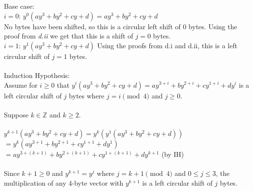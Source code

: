 \documentclass{assignment}
\newcommand\tab[1][0.5cm]{\hspace*{#1}}
\begin{document}
\begin{problemlist}
\begin{problem}
\begin{answer}
Base case:\\
$i=0$: $y^0(ay^3+by^2+cy+d)=ay^3+by^2+cy+d$ \\
\tab No bytes have been shifted, so this is a circular left shift of 0 bytes. Using the proof from \emph{d.ii} we get that this is a shift of $j=0$ bytes. \\
$i=1$: $y^1(ay^3+by^2+cy+d)$  Using the proofs from d.i and d.ii, this is a left circular shift of $j=1$ bytes.\\
\\
Induction Hypothesis:\\
Assume for $i\geq 0$ that $y^i(ay^3+by^2+cy+d)=ay^{3+i}+by^{2+i}+cy^{1+i}+dy^i$ is a left circular shift of $j$ bytes where $j=i \pmod 4$ and $j\geq 0$.\\
\\
Suppose $k \in \mathbb{Z}$ and $k \geq 2$.\\
\\
$y^{k+1}(ay^3+by^2+cy+d)= y^k(y^1(ay^3+by^2+cy+d))$\\
$= y^k(ay^{3+1}+by^{2+1}+cy^{1+1}+dy^{1})$\\
$= ay^{3+(k+1)}+by^{2+(k+1)}+cy^{1+(k+1)}+dy^{k+1}$ (by IH)\\
\\
Since $k+1\geq 0$ and $y^{k+1}=y^j$ where $j=k+1 \pmod 4$ and $0\leq j\leq 3$, the multiplication of any 4-byte vector with $y^{k+1}$ is a left circular shift of $j$ bytes.\\
\\
\end{answer}
\end{problem}


\end{problemlist}
\end{document}
